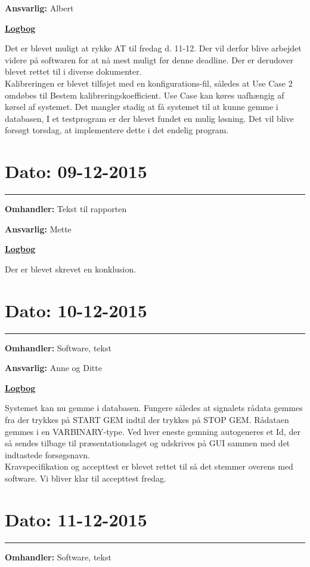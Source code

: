 \textbf{Ansvarlig:} Albert 

\underline{\textbf{Logbog}}

Det er blevet muligt at rykke AT til fredag d. 11-12. Der vil derfor blive arbejdet videre på softwaren for at nå mest muligt før denne deadline. Der er derudover blevet rettet til i diverse dokumenter. \\
Kalibreringen er blevet tilføjet med en konfigurations-fil, således at Use Case 2 omdøbes til Bestem kalibreringskoefficient. Use Case kan køres uafhængig af kørsel af systemet. Det mangler stadig at få systemet til at kunne gemme i databasen, I et testprogram er der blevet fundet en mulig løsning. Det vil blive forsøgt torsdag, at implementere dette i det endelig program.
\\

\section{Dato: 09-12-2015}
\hrule
\textbf{Omhandler:} Tekst til rapporten 

\textbf{Ansvarlig:} Mette 

\underline{\textbf{Logbog}}

Der er blevet skrevet en konklusion. 
\\

\section{Dato: 10-12-2015}
\hrule
\textbf{Omhandler:} Software, tekst

\textbf{Ansvarlig:} Anne og Ditte

\underline{\textbf{Logbog}}

Systemet kan nu gemme i databasen. Fungere således at signalets rådata gemmes fra der trykkes på START GEM indtil der trykkes på STOP GEM. Rådataen gemmes i en VARBINARY-type. Ved hver eneste gemning autogeneres et Id, der så sendes tilbage til præsentationslaget og udskrives på GUI sammen med det indtastede forsøgsnavn. \\
Kravspecifikation og accepttest er blevet rettet til så det stemmer overens med software. Vi bliver klar til accepttest fredag.
\\

\section{Dato: 11-12-2015}
\hrule
\textbf{Omhandler:} Software, tekst

